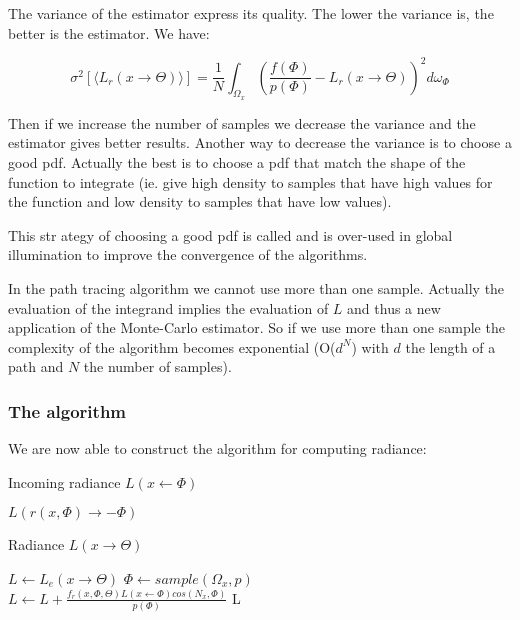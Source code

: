 The variance of the estimator express its quality. The lower the variance is, the better is the estimator. We have:

\begin{equation*}
\sigma^2[\langle L_r(x \rightarrow \Theta) \rangle] = \frac{1}{N} \int_{\Omega_x} (\frac{f(\Phi)}{p(\Phi)} - L_r(x \rightarrow \Theta))^2 d\omega_\Phi
\end{equation*}

Then if we increase the number of samples we decrease the variance and the estimator gives better results. Another way to decrease the variance is to choose a good pdf. Actually the best is to choose a pdf that match the shape of the function to integrate (ie. give high density to samples that have high values for the function and low density to samples that have low values).

This str	ategy of choosing a good pdf is called  and is over-used in global illumination to improve the convergence of the algorithms.

In the path tracing algorithm we cannot use more than one sample. Actually the evaluation of the integrand implies the evaluation of $L$ and thus a new application of the Monte-Carlo estimator. So if we use more than one sample the complexity of the algorithm becomes exponential (O($d^N$) with $d$ the length of a path and $N$ the number of samples).

\subsubsection{The algorithm}

We are now able to construct the algorithm for computing radiance:

\begin{algorithm}[h!]
\label{algo::incoming_radiance}
\caption[incoming_radiance]{Incoming radiance $L(x \leftarrow \Phi)$}
\Return $L(r(x, \Phi) \rightarrow -\Phi)$\;
\end{algorithm}

\begin{algorithm}[h!]
\label{algo::radiance}
\caption[radiance]{Radiance $L(x \rightarrow \Theta)$}
$L \gets L_e(x \rightarrow \Theta)$\;
 {
	$\Phi \gets sample(\Omega_x, p)$ \\
	$L \gets L + \frac{f_r(x, \Phi, \Theta) L(x \leftarrow \Phi) cos(N_x, \Phi)}{p(\Phi)}$\;
}
\Return L\;
\end{algorithm}

